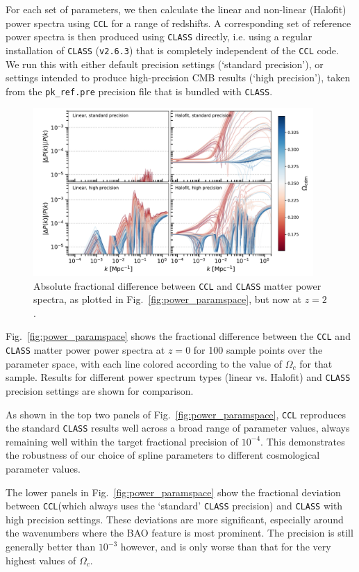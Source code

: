 \documentclass[\docopts]{\docclass}
\newcommand{\ccl}{{\tt CCL}\xspace}
\begin{document}
For each set of parameters, we then calculate the linear and non-linear (Halofit) power spectra using \ccl for a range of redshifts. A corresponding set of reference power spectra is then produced using {\tt CLASS} directly, i.e. using a regular installation of {\tt CLASS} ({\tt v2.6.3}) that is completely independent of the \ccl code. We run this with either default precision settings (`standard precision'), or settings intended to produce high-precision CMB results (`high precision'), taken from the {\tt pk\_ref.pre} precision file that is bundled with {\tt CLASS}.

\begin{figure}
\centering
\includegraphics[width=0.95\textwidth]{pkdev_z2}
\caption{Absolute fractional difference between \ccl and {\tt CLASS} matter power spectra, as plotted in Fig.~\ref{fig:power_paramspace}, but now at $z=2$.}
\label{fig:power_paramspace_z2}
\end{figure}

Fig.~\ref{fig:power_paramspace} shows the fractional difference between the \ccl and {\tt CLASS} matter power power spectra at $z=0$ for 100 sample points over the parameter space, with each line colored according to the value of $\Omega_c$ for that sample. Results for different power spectrum types (linear vs. Halofit) and {\tt CLASS} precision settings are shown for comparison.

As shown in the top two panels of Fig.~\ref{fig:power_paramspace}, \ccl reproduces the standard {\tt CLASS} results well across a broad range of parameter values, always remaining well within the target fractional precision of $10^{-4}$. This demonstrates the robustness of our choice of spline parameters to different cosmological parameter values.

The lower panels in Fig.~\ref{fig:power_paramspace} show the fractional deviation between \ccl (which always uses the `standard' {\tt CLASS} precision) and {\tt CLASS} with high precision settings. These deviations are more significant, especially around the wavenumbers where the BAO feature is most prominent. The precision is still generally better than $10^{-3}$ however, and is only worse than that for the very highest values of $\Omega_c$.
\end{document}
